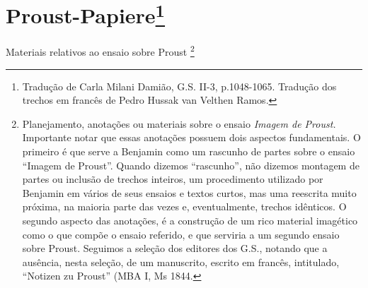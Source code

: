 \chapter{Proust-Papiere\footnote[*]{Tradução de Carla Milani
  Damião, G.S. II-3, p.1048-1065. Tradução dos trechos em francês de
  Pedro Hussak van Velthen Ramos.}}

Materiais relativos ao ensaio sobre Proust \footnote{Planejamento,
  anotações ou materiais sobre o ensaio \emph{Imagem de Proust.}
  Importante notar que essas anotações possuem dois aspectos
  fundamentais. O primeiro é que serve a Benjamin como um rascunho de
  partes sobre o ensaio ``Imagem de Proust''. Quando dizemos
  ``rascunho'', não dizemos montagem de partes ou inclusão de trechos
  inteiros, um procedimento utilizado por Benjamin em vários de seus
  ensaios e textos curtos, mas uma reescrita muito próxima, na maioria
  parte das vezes e, eventualmente, trechos idênticos. O segundo aspecto
  das anotações, é a construção de um rico material imagético como o que
  compõe o ensaio referido, e que serviria a um segundo ensaio sobre
  Proust. Seguimos a seleção dos editores dos G.S., notando que a
  ausência, nesta seleção, de um manuscrito, escrito em francês,
  intitulado, ``Notizen zu Proust'' (MBA I, Ms 1844.}

